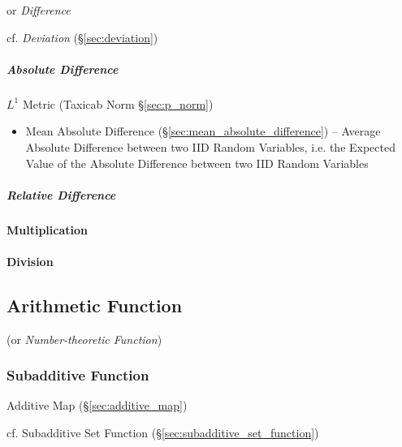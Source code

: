or \emph{Difference}

cf. \emph{Deviation} (\S\ref{sec:deviation})



\subparagraph{Absolute Difference}\label{sec:absolute_difference}\hfill


$L^1$ Metric (Taxicab Norm \S\ref{sec:p_norm})

\begin{itemize}
  \item Mean Absolute Difference (\S\ref{sec:mean_absolute_difference}) --
    Average Absolute Difference between two IID Random Variables, i.e. the
    Expected Value of the Absolute Difference between two IID Random Variables
\end{itemize}



\subparagraph{Relative Difference}\label{sec:relative_difference}\hfill




\paragraph{Multiplication}\label{sec:addition}\hfill

\paragraph{Division}\label{sec:addition}\hfill



\subsection{Arithmetic Function}\label{sec:arithmetic_function}

(or \emph{Number-theoretic Function})



\subsubsection{Subadditive Function}\label{sec:subadditive_function}

Additive Map (\S\ref{sec:additive_map})

cf. Subadditive Set Function (\S\ref{sec:subadditive_set_function})

